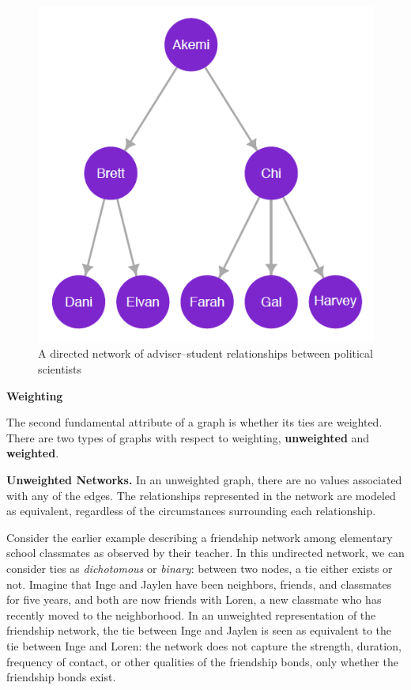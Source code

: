 \documentclass{book}
\begin{document}
\begin{figure}
\centering
\includegraphics{images/social-networks/11-3.png}
\caption{A directed network of adviser--student relationships between
political scientists}
\end{figure}

\textbf{Weighting}

The second fundamental attribute of a graph is whether its ties are weighted.
There are two types of graphs with respect to weighting, \textbf{unweighted}
and \textbf{weighted}.

\textbf{Unweighted Networks.} In an unweighted graph, there are no values
associated with any of the edges. The relationships represented in the network
are modeled as equivalent, regardless of the circumstances surrounding each
relationship.

Consider the earlier example describing a friendship network among elementary
school classmates as observed by their teacher. In this undirected network, we
can consider ties as \emph{dichotomous} or \emph{binary}: between two nodes, a
tie either exists or not. Imagine that Inge and Jaylen have been neighbors,
friends, and classmates for five years, and both are now friends with Loren, a
new classmate who has recently moved to the neighborhood. In an unweighted
representation of the friendship network, the tie between Inge and Jaylen is
seen as equivalent to the tie between Inge and Loren: the network does not
capture the strength, duration, frequency of contact, or other qualities of
the friendship bonds, only whether the friendship bonds exist.
\end{document}
